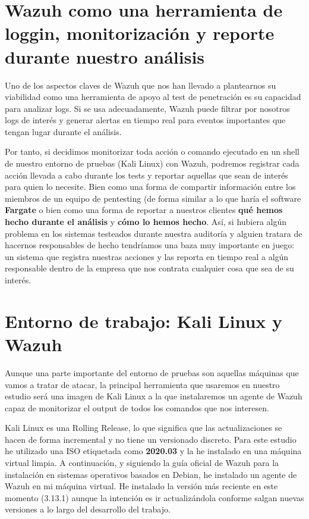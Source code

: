 \section{Wazuh como una herramienta de loggin, monitorización y reporte durante nuestro análisis}

Uno de los aspectos claves de Wazuh que nos han llevado a plantearnos su viabilidad como una herramienta de apoyo al test de penetración es su capacidad para analizar logs. Si se usa adecuadamente, Wazuh puede filtrar por nosotros logs de interés y generar alertas en tiempo real para eventos importantes que tengan lugar durante el análisis.

Por tanto, si decidimos monitorizar toda acción o comando ejecutado en un shell de nuestro entorno de pruebas (Kali Linux) con Wazuh, podremos registrar cada acción llevada a cabo durante los tests y reportar aquellas que sean de interés para quien lo necesite. Bien como una forma de compartir información entre los miembros de un equipo de pentesting (de forma similar a lo que haría el software \textbf{Fargate} o bien como una forma de reportar a nuestros clientes \textbf{qué hemos hecho durante el análisis} y \textbf{cómo lo hemos hecho}. Así, si hubiera algún problema en los sistemas testeados durante nuestra auditoría y alguien tratara de hacernos responsables de hecho tendríamos una baza muy importante en juego: un sistema que registra nuestras acciones y las reporta en tiempo real a algún responsable dentro de la empresa que nos contrata cualquier cosa que sea de su interés.

\section{Entorno de trabajo: Kali Linux y Wazuh}

Aunque una parte importante del entorno de pruebas son aquellas máquinas que vamos a tratar de atacar, la principal herramienta que usaremos en nuestro estudio será una imagen de Kali Linux a la que instalaremos un agente de Wazuh capaz de monitorizar el output de todos los comandos que nos interesen. 

Kali Linux es una \Gls{Rolling Release}, lo que significa que las actualizaciones se hacen de forma incremental y no tiene un versionado discreto. Para este estudio he utilizado una ISO etiquetada como \textbf{2020.03} y la he instalado en una máquina virtual limpia. A continuación, y siguiendo la guía oficial de Wazuh para la instalación en sistemas operativos basados en Debian, he instalado un agente de Wazuh en mi máquina virtual. He instalado la versión más reciente en este momento (3.13.1) aunque la intención es ir actualizándola conforme salgan nuevas versiones a lo largo del desarrollo del trabajo.

